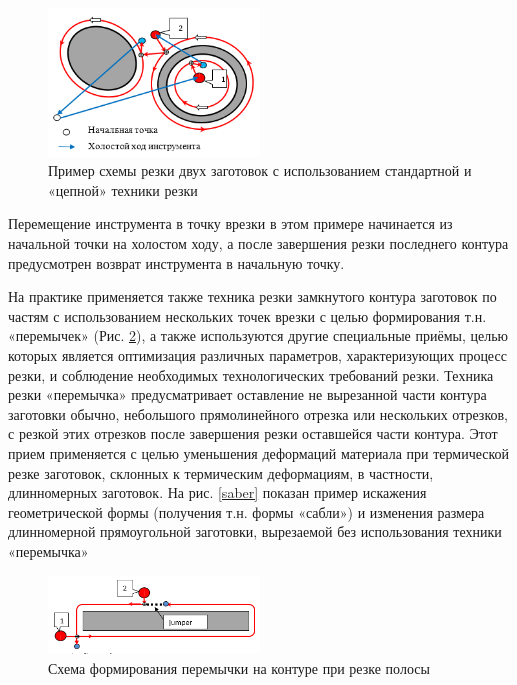 \documentclass{article}
\begin{document}
\begin{figure}
  \begin{center}
  \includegraphics[width=0.5\textwidth]{chain.png}
  \caption{Пример схемы резки двух заготовок с использованием стандартной и «цепной» техники резки}
  \label{chain}
  \end{center}
\end{figure}

Перемещение инструмента в точку врезки
в этом примере начинается из начальной точки на холостом ходу,
а после завершения резки последнего контура
предусмотрен возврат инструмента в начальную точку.

На практике применяется также техника резки
замкнутого контура заготовок по частям
с использованием нескольких точек врезки
с целью формирования т.н. «перемычек»
(Рис. \ref{jumper}),
а также используются другие специальные приёмы,
целью которых является оптимизация различных параметров,
характеризующих процесс резки,
и соблюдение необходимых технологических требований резки.
Техника резки «перемычка» предусматривает
оставление не вырезанной части контура заготовки обычно,
небольшого прямолинейного отрезка или нескольких отрезков,
с резкой этих отрезков после завершения резки оставшейся части контура.
Этот прием применяется с целью уменьшения деформаций материала
при термической резке заготовок, склонных к термическим деформациям,
в частности, длинномерных заготовок.
На рис. \ref{saber} показан пример искажения геометрической формы
(получения т.н. формы «сабли»)
и изменения размера длинномерной прямоугольной заготовки,
вырезаемой без использования техники «перемычка»

\begin{figure}
  \begin{center}
  \includegraphics[width=0.5\textwidth]{jumper.png}
  \caption{Схема формирования перемычки на контуре при резке полосы}
  \label{jumper}
  \end{center}
\end{figure}
\end{document}
